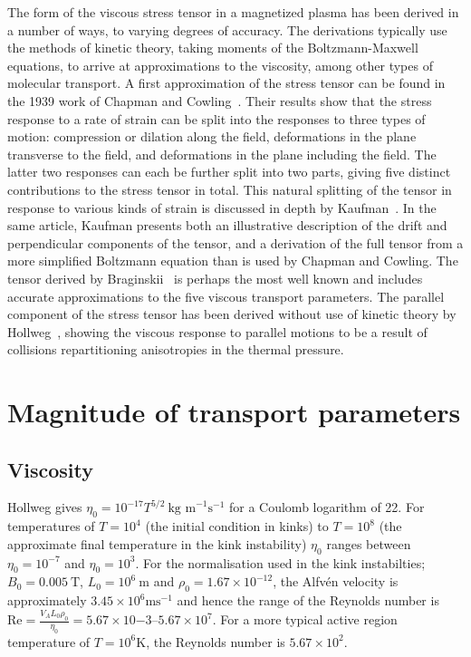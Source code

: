 The form of the viscous stress tensor in a magnetized plasma has been derived in a number of ways, to varying degrees of accuracy. The derivations typically use the methods of kinetic theory, taking moments of the Boltzmann-Maxwell equations, to arrive at approximations to the viscosity, among other types of molecular transport. A first approximation of the stress tensor can be found in the 1939 work of Chapman and Cowling~\cite{chapmanMathematicalTheoryNonuniform1970}. Their results show that the stress response to a rate of strain can be split into the responses to three types of motion: compression or dilation along the field, deformations in the plane transverse to the field, and deformations in the plane including the field. The latter two responses can each be further split into two parts, giving five distinct contributions to the stress tensor in total. This natural splitting of the tensor in response to various kinds of strain is discussed in depth by Kaufman~\cite{kaufmanPlasmaViscosityMagnetic1960}. In the same article, Kaufman presents both an illustrative description of the drift and perpendicular components of the tensor, and a derivation of the full tensor from a more simplified Boltzmann equation than is used by Chapman and Cowling. The tensor derived by Braginskii~\cite{braginskiiTransportProcessesPlasma1965} is perhaps the most well known and includes accurate approximations to the five viscous transport parameters. The parallel component of the stress tensor has been derived without use of kinetic theory by Hollweg~\cite{hollwegViscosityMagnetizedPlasma1985}, showing the viscous response to parallel motions to be a result of collisions repartitioning anisotropies in the thermal pressure. 

\section{Magnitude of transport parameters}

\subsection{Viscosity}

Hollweg gives $\eta_0 = 10^{-17} T^{5/2}\ \text{kg m}^{-1} \text{s}^{-1}$ for a Coulomb logarithm of 22. For temperatures of $T=10^4$ (the initial condition in kinks) to $T=10^8$ (the approximate final temperature in the kink instability) $\eta_0$ ranges between $\eta_0 = 10^{-7}$ and $\eta_0 = 10^3$. For the normalisation used in the kink instabilties; $B_0 = 0.005\ \text{T}$, $L_0 = 10^6\ \text{m}$ and $\rho_0 = 1.67 \times 10^{-12}$, the Alfv\'en velocity is approximately $3.45 \times 10^6 \text{ms}^{-1}$ and hence the range of the Reynolds number is $\text{Re} = \frac{V_A L_0 \rho_0}{\eta_0} = 5.67 \times 10{-3}$--$5.67 \times 10^{7}$. For a more typical active region temperature of $T=10^6 \text{K}$, the Reynolds number is $5.67 \times 10^2$. 

